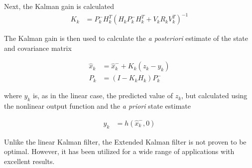 Next, the Kalman gain is calculated
\begin{align}
K_k &=P^-_kH^T_k(H_kP^-_kH^T_k+V_kR_kV^T_k)^{-1}
\end{align}

The Kalman gain is then used to calculate the \textit{a posteriori} estimate of the state and covariance matrix

\begin{align}
\hat{x}_k &=\hat{x}^-_{k}+K_k(z_k-y_k)\\
\label{kalmanVariance}
P_k &=(I-K_kH_k)P^-_k
\end{align}

where $y_k$ is, as in the linear case, the predicted value of $z_k$, but calculated using the nonlinear output function and the \textit{a priori} state estimate

\begin{align}
y_k &= h(\hat{x}^-_k,0)
\end{align}

Unlike the linear Kalman filter, the Extended Kalman filter is not proven to be optimal. However, it has been utilized for a wide range of applications with excellent results.
